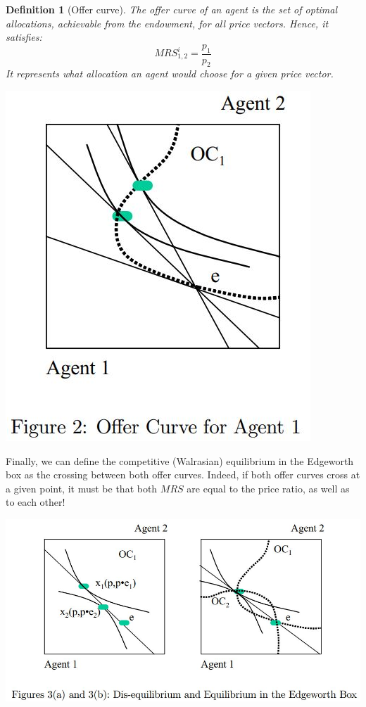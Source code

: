 \documentclass[12pt]{report}
\newtheorem{definition}{Definition}[chapter]
\begin{document}
\begin{definition}[Offer curve]
The offer curve of an agent is the set of optimal allocations, achievable from the endowment, for all price vectors. Hence, it satisfies: $$MRS_{1,2}^i = \frac{p_1}{p_2}$$ It represents what allocation an agent would choose for a given price vector.
\end{definition}

\begin{center}
\includegraphics[scale=0.43]{images/edge05}
\end{center}

Finally, we can define the competitive (Walrasian) equilibrium in the Edgeworth box as the crossing between both offer curves. Indeed, if both offer curves cross at a given point, it must be that both $MRS$ are equal to the price ratio, as well as to each other! \begin{center}
\includegraphics[scale=0.45]{images/edge06}
\end{center}
\end{document}
